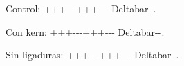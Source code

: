 \documentclass{article}
\begin{document}
Control: +++---+++--- Deltabar--.

Con kern: +++-\kern0pt{}-\kern0pt{}-+++-\kern0pt{}-\kern0pt{}- Deltabar-\kern0pt{}-.

{Sin ligaduras: +++---+++--- Deltabar--.}
\end{document}
